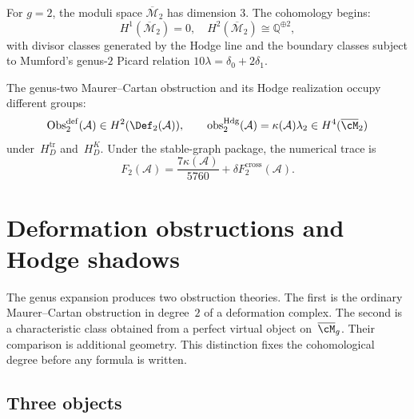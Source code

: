 \begin{example}
\label{ex:genus-2-obstruction}
For $g=2$, the moduli space $\overline{\mathcal{M}}_2$ has dimension 3. The cohomology begins:
\begin{equation}
H^1(\overline{\mathcal{M}}_2) = 0, \quad
H^2(\overline{\mathcal{M}}_2) \cong \mathbb{Q}^{\oplus 2},
\end{equation}
with divisor classes generated by the Hodge line and the boundary
classes subject to Mumford's genus-$2$ Picard relation
$10\lambda=\delta_0+2\delta_1$.

The genus-two Maurer--Cartan obstruction and its Hodge realization
occupy different groups:
\[
 \operatorname{Obs}^{\mathrm{def}}_2(\mathcal A)
 \in H^2(\Def_2(\mathcal A)),
 \qquad
 \operatorname{obs}^{\mathrm{Hdg}}_2(\mathcal A)
 =\kappa(\mathcal A)\lambda_2
 \in H^4(\overline{\cM}_2)
\]
under~$H_D^{\mathrm{tr}}$ and~$H_D^K$.  Under the stable-graph
package, the numerical trace is
\[
 F_2(\mathcal A)=\frac{7\kappa(\mathcal A)}{5760}
 +\delta F_2^{\mathrm{cross}}(\mathcal A).
\]
\end{example}


\section{Deformation obstructions and Hodge shadows}
\label{sec:obstruction-explicit}

The genus expansion produces two obstruction theories.  The first is
the ordinary Maurer--Cartan obstruction in degree~$2$ of a deformation
complex.  The second is a characteristic class obtained from a perfect
virtual object on~$\overline{\cM}_g$.  Their comparison is additional
geometry.  This distinction fixes the cohomological degree before any
formula is written.

\subsection{Three objects}
\label{subsec:obstruction-framework-recall}

